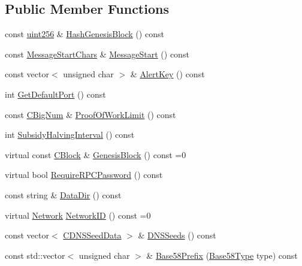 \subsection*{Public Member Functions}
\begin{DoxyCompactItemize}
\item 
const \hyperlink{classuint256}{uint256} \& \hyperlink{class_c_chain_params_a40411665bb7ca75a8758d33594901e91}{Hash\+Genesis\+Block} () const 
\item 
const \hyperlink{chainparams_8h_a606a5a0100b84686ef50bf2cb2a591a0}{Message\+Start\+Chars} \& \hyperlink{class_c_chain_params_aed24d767f003a1b963d10fcc490e5c31}{Message\+Start} () const 
\item 
const vector$<$ unsigned char $>$ \& \hyperlink{class_c_chain_params_aff2037b134fae4df26ee17ddb13e0d3e}{Alert\+Key} () const 
\item 
int \hyperlink{class_c_chain_params_afdb7793273cdb87cc5fd75450eb2258b}{Get\+Default\+Port} () const 
\item 
const \hyperlink{class_c_big_num}{C\+Big\+Num} \& \hyperlink{class_c_chain_params_ad44a223db9e6e744d56007e0700a90b3}{Proof\+Of\+Work\+Limit} () const 
\item 
int \hyperlink{class_c_chain_params_a22301443ebfa49c61f9a7d75b03a84f2}{Subsidy\+Halving\+Interval} () const 
\item 
virtual const \hyperlink{class_c_block}{C\+Block} \& \hyperlink{class_c_chain_params_abee677792d8f64e9dc766738ca0fbb55}{Genesis\+Block} () const =0
\item 
virtual bool \hyperlink{class_c_chain_params_a8020e6cada6b54010640f4ebd3918615}{Require\+R\+P\+C\+Password} () const 
\item 
const string \& \hyperlink{class_c_chain_params_ad11dd170e65650ff4b12d45a32b9c774}{Data\+Dir} () const 
\item 
virtual \hyperlink{class_c_chain_params_a5c4bb1d7c0205399ff06ee58fab7f176}{Network} \hyperlink{class_c_chain_params_a90dc493ec0c0325c98c3ac06eb99862b}{Network\+I\+D} () const =0
\item 
const vector$<$ \hyperlink{struct_c_d_n_s_seed_data}{C\+D\+N\+S\+Seed\+Data} $>$ \& \hyperlink{class_c_chain_params_a6ad644576193885d2be4959abd2a7317}{D\+N\+S\+Seeds} () const 
\item 
const std\+::vector$<$ unsigned char $>$ \& \hyperlink{class_c_chain_params_a6088d3a4f45d89c90e7e6117c3c5720d}{Base58\+Prefix} (\hyperlink{class_c_chain_params_aa294058ec2e3586bd8d03d6c39667058}{Base58\+Type} type) const 
\item 

\end{DoxyCompactItemize}
